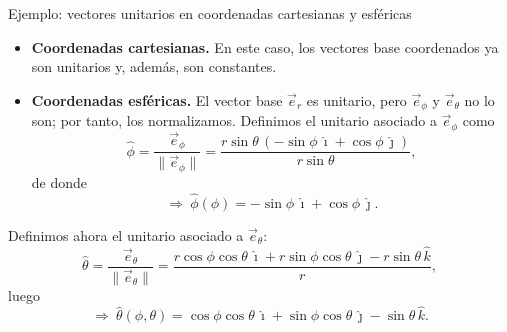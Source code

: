 \documentclass[../apunte_mecanica_clasica.tex]{subfiles}%
\begin{document}
\begin{apuntebloque}{Ejemplo: vectores unitarios en coordenadas cartesianas y esféricas}
\begin{itemize}
  \item[a)] \textbf{Coordenadas cartesianas.}  
  En este caso, los vectores base coordenados ya son unitarios y, además, son constantes.

  \item[b)] \textbf{Coordenadas esféricas.}  
  El vector base $\vec{e}_r$ es unitario, pero $\vec{e}_\phi$ y $\vec{e}_\theta$ no lo son; por tanto, los normalizamos. Definimos el unitario asociado a $\vec{e}_\phi$ como
  \begin{equation*}
    \hat{\phi}
    = \frac{\vec{e}_\phi}{\|\vec{e}_\phi\|}
    = \frac{r\sin\theta\,(-\sin\phi\,\hat{\imath}+\cos\phi\,\hat{\jmath})}{r\sin\theta},
  \end{equation*}
  de donde
  \begin{equation*}
    \Rightarrow\ \hat{\phi}(\phi) = -\sin\phi\,\hat{\imath} + \cos\phi\,\hat{\jmath}.
  \end{equation*}

\end{itemize}

Definimos ahora el unitario asociado a $\vec{e}_\theta$:
\begin{equation*}
  \hat{\theta}
  = \frac{\vec{e}_\theta}{\|\vec{e}_\theta\|}
  = \frac{r\cos\phi\cos\theta\,\hat{\imath}+r\sin\phi\cos\theta\,\hat{\jmath}-r\sin\theta\,\hat{k}}{r},
\end{equation*}
luego
\begin{equation*}
  \Rightarrow\ \hat{\theta}(\phi,\theta)
  = \cos\phi\cos\theta\,\hat{\imath} + \sin\phi\cos\theta\,\hat{\jmath} - \sin\theta\,\hat{k}.
\end{equation*}

\end{apuntebloque}
\end{document}
